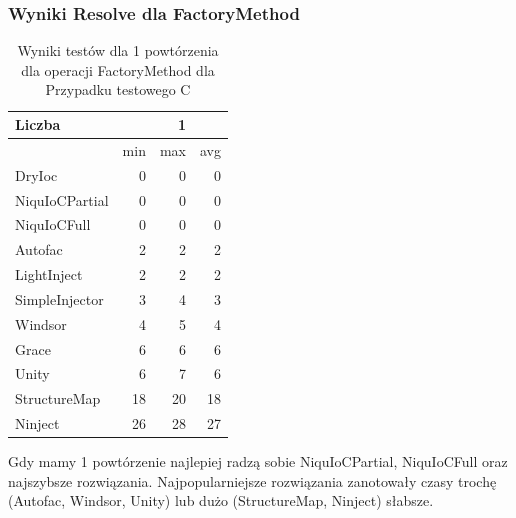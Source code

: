 \documentclass[12pt]{article}
\begin{document}
\subsubsection{Wyniki Resolve dla FactoryMethod}
\begin{table}[H]
\captionsetup{belowskip=0pt,aboveskip=0pt}
\begin{center}
\begin{small}
	\begin{tabular}{ | l | r r r | }
    		\hline
Liczba & & 1 & \\ \hline
 & min & max & avg \\ \hline
DryIoc & 0 & 0 & 0 \\ \hline
NiquIoCPartial & 0 & 0 & 0 \\ \hline
NiquIoCFull & 0 & 0 & 0 \\ \hline
Autofac & 2 & 2 & 2 \\ \hline
LightInject & 2 & 2 & 2 \\ \hline
SimpleInjector & 3 & 4 & 3 \\ \hline
Windsor & 4 & 5 & 4 \\ \hline
Grace & 6 & 6 & 6 \\ \hline
Unity & 6 & 7 & 6 \\ \hline
StructureMap & 18 & 20 & 18 \\ \hline
Ninject & 26 & 28 & 27 \\ \hline
  	\end{tabular}
\end{small}
\end{center}
\caption{Wyniki testów dla 1 powtórzenia dla operacji FactoryMethod dla Przypadku testowego C}
\label{TestCaseC_FactoryMethod1}
\end{table}
Gdy mamy 1 powtórzenie najlepiej radzą sobie NiquIoCPartial, NiquIoCFull oraz najszybsze rozwiązania. Najpopularniejsze rozwiązania zanotowały czasy trochę (Autofac, Windsor, Unity) lub dużo (StructureMap, Ninject) słabsze.
\\ \\
\end{document}
